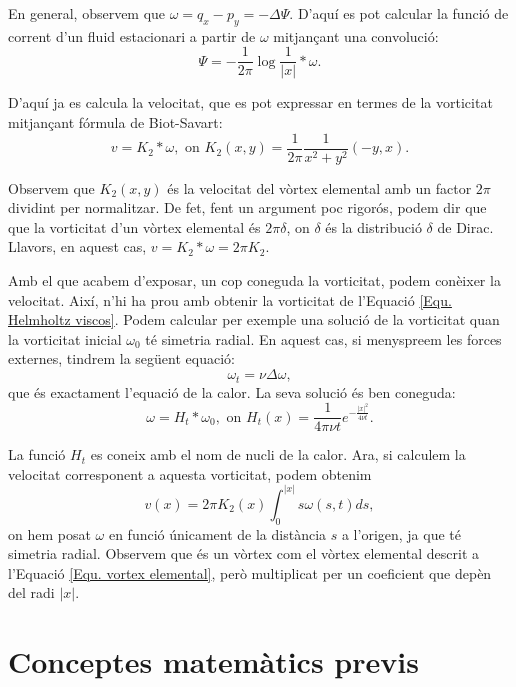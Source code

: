 \documentclass{article}
\numberwithin{equation}{section}
\begin{document}
En general, observem que $\omega=q_x-p_y=-\Delta\Psi$. D'aqu\'{i} es pot calcular la funci\'{o} de corrent d'un fluid estacionari a partir de $\omega$ mitjan\c{c}ant una convoluci\'{o}:
\[\Psi=-\frac{1}{2\pi}\log\frac{1}{|x|}*\omega.\]

D'aqu\'{i} ja es calcula la velocitat, que es pot expressar en termes de la vorticitat mitjan\c{c}ant f\'{o}rmula de Biot-Savart:
\begin{equation}
v=K_2*\omega,\text{ on }K_2(x,y)=\frac{1}{2\pi}\frac{1}{x^2+y^2}(-y,x).
\end{equation}

Observem que $K_2(x,y)$ \'{e}s la velocitat del v\`{o}rtex elemental amb un factor $2\pi$ dividint per normalitzar. De fet, fent un argument poc rigor\'{o}s, podem dir que que la vorticitat d'un v\`{o}rtex elemental \'{e}s $2\pi\delta$, on $\delta$ \'{e}s la distribuci\'{o} $\delta$ de Dirac. Llavors, en aquest cas, $v=K_2*\omega=2\pi K_2$.

Amb el que acabem d'exposar, un cop coneguda la vorticitat, podem con\`{e}ixer la velocitat. Aix\'{i}, n'hi ha prou amb obtenir la vorticitat de l'Equaci\'{o} \eqref{Equ. Helmholtz viscos}. Podem calcular per exemple una soluci\'{o} de la vorticitat quan la vorticitat inicial $\omega_0$ t\'{e} simetria radial. En aquest cas, si menyspreem les forces externes, tindrem la seg\"{u}ent equaci\'{o}:
\[\omega_t=\nu\Delta\omega,\]
que \'{e}s exactament l'equaci\'{o} de la calor. La seva soluci\'{o} \'{e}s ben coneguda:
\begin{equation}\label{Equ. calor}
\omega=H_t*\omega_0,\text{ on }H_t(x)=\frac{1}{4\pi\nu t}e^{-\frac{|x|^2}{4\nu t}}.
\end{equation}

La funci\'{o} $H_t$ es coneix amb el nom de nucli de la calor. Ara, si calculem la velocitat corresponent a aquesta vorticitat, podem obtenim
\begin{equation}\label{Equ. Biot-Savart temporal}
v(x)=2\pi K_2(x)\int_0^{|x|}s\omega(s,t)ds,
\end{equation}
on hem posat $\omega$ en funci\'{o} \'{u}nicament de la dist\`{a}ncia $s$ a l'origen, ja que t\'{e} simetria radial. Observem que \'{e}s un v\`{o}rtex com el v\`{o}rtex elemental descrit a l'Equaci\'{o} \eqref{Equ. vortex elemental}, per\`{o} multiplicat per un coeficient que dep\`{e}n del radi $|x|$.

\section{Conceptes matem\`{a}tics previs}
\end{document}
